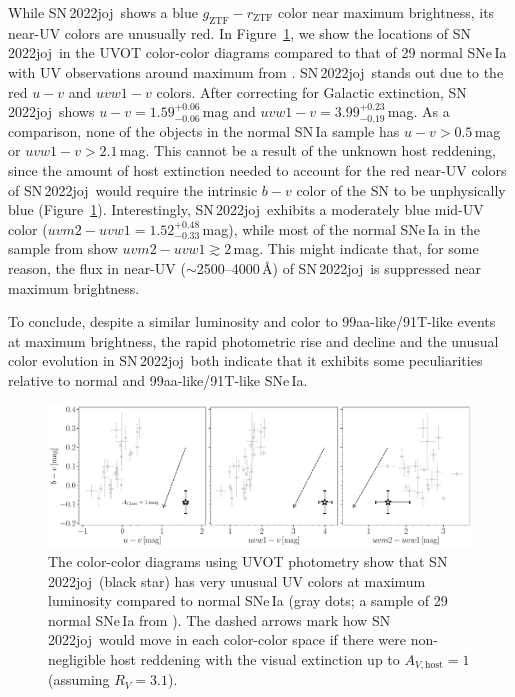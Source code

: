 \documentclass[twocolumn]{aastex631}
\newcommand{\sn}{SN\,2022joj}
\begin{document}
\begin{CJK*}{UTF8}{gbsn}
While \sn\ shows a blue $g_\mathrm{ZTF}-r_\mathrm{ZTF}$ color near maximum brightness, its near-UV colors are unusually red. In Figure~\ref{fig:UVOT}, we show the locations of \sn\ in the UVOT color-color diagrams compared to that of 29 normal SNe\,Ia with UV observations around maximum from \citet{Brown_2018}. \sn\ stands out due to the red $u-v$ and $uvw1-v$ colors. After correcting for Galactic extinction, \sn\ shows $u-v=1.59^{+0.06}_{-0.06}$\,mag and $uvw1 - v=3.99^{+0.23}_{-0.19}$\,mag. As a comparison, none of the objects in the normal SN\,Ia sample has $u-v>0.5$\,mag or $uvw1 - v>2.1$\,mag. This cannot be a result of the unknown host reddening, since the amount of host extinction needed to account for the red near-UV colors of \sn\ would require the intrinsic $b-v$ color of the SN to be unphysically blue (Figure~\ref{fig:UVOT}). Interestingly, \sn\ exhibits a moderately blue mid-UV color ($uvm2-uvw1=1.52^{+0.48}_{-0.33}$\,mag), while most of the normal SNe\,Ia in the sample from \citet{Brown_2018} show $uvm2-uvw1\gtrsim2$\,mag. This might indicate that, for some reason, the flux in near-UV ($\sim$2500--4000\,\r{A}) of \sn\ is suppressed near maximum brightness.

To conclude, despite a similar luminosity and color to 99aa-like/91T-like events at maximum brightness, the rapid photometric rise and decline and the unusual color evolution in \sn\ both indicate that it exhibits some peculiarities relative to normal and 99aa-like/91T-like SNe\,Ia.

\begin{figure}
    \centering
    \includegraphics[width=\linewidth]{UVOT_colors.pdf}
    \caption{The color-color diagrams using UVOT photometry show that \sn\ (black star) has very unusual UV colors at maximum luminosity compared to normal SNe\,Ia (gray dots; a sample of 29 normal SNe\,Ia from \citealp{Brown_2018}). The dashed arrows mark how \sn\ would move in each color-color space if there were non-negligible host reddening with the visual extinction up to $A_{V,\mathrm{host}}=1$ (assuming $R_V=3.1$). 
    }
    \label{fig:UVOT}
\end{figure}



\end{CJK*}
\end{document}
